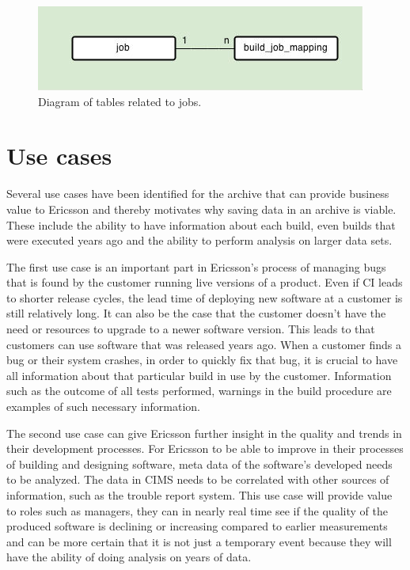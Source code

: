 \begin{figure}[h!]
\centering
\includegraphics[scale=0.5]{figure/job.jpg}
\caption{Diagram of tables related to jobs.}
\label{fig:job}
\end{figure}

\section{Use cases}
\label{sec:usecases}
Several use cases have been identified for the archive that can provide business value to Ericsson and thereby motivates why saving data in an archive is viable. These include the ability to have information about each build, even builds that were executed years ago and the ability to perform analysis on larger data sets. 

The first use case is an important part in Ericsson's process of managing bugs that is found by the customer running live versions of a product. Even if CI leads to shorter release cycles, the lead time of deploying new software at a customer is still relatively long. It can also be the case that the customer doesn't have the need or resources to upgrade to a newer software version. This leads to that customers can use software that was released years ago. When a customer finds a bug or their system crashes, in order to quickly fix that bug, it is crucial to have all information about that particular build in use by the customer. Information such as the outcome of all tests performed, warnings in the build procedure are examples of such necessary information. 

The second use case can give Ericsson further insight in the quality and trends in their development processes. For Ericsson to be able to improve in their processes of building and designing software, meta data of the software's developed needs to be analyzed. The data in CIMS needs to be correlated with other sources of information, such as the trouble report system. This use case will provide value to roles such as managers, they can in nearly real time see if the quality of the produced software is declining or increasing compared to earlier measurements and can be more certain that it is not just a temporary event because they will have the ability of doing analysis on years of data. 


